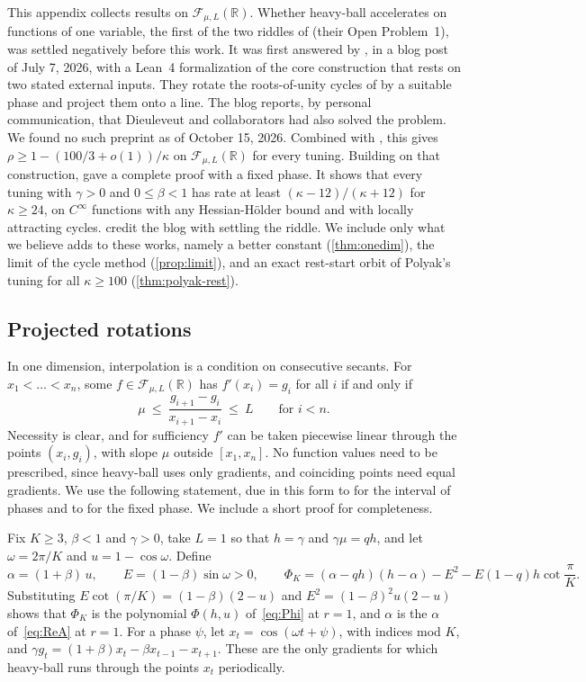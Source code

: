 \documentclass[11pt, a4paper]{article}
\theoremstyle{definition}
\newcommand{\R}{\mathbb{R}}
\newcommand{\F}{\mathcal{F}_{\mu,L}}
\begin{document}
This appendix collects results on $\F(\R)$. Whether heavy-ball accelerates on functions of one variable, the first of
the two riddles of \citet{goujaud2025riddles} (their Open Problem~1), was settled negatively before this work. It was
first answered by \citet{fotopoulos2026cycling}, in a blog post of July 7, 2026, with a Lean~4 formalization of the core
construction that rests on two stated external inputs. They rotate the roots-of-unity cycles of
\citet{goujaud2025provable} by a suitable phase and project them onto a line. The blog reports, by personal
communication, that Dieuleveut and collaborators had also solved the problem. We found no such preprint as of October 15,
2026. Combined with \citet[Thm.~3.6]{goujaud2025provable}, this gives $\rho\ge1-(100/3+o(1))/\kappa$ on $\F(\R)$ for
every tuning. Building on that construction, \citet[App.~F, Thm.~8]{liu2026sharp} gave a complete proof with a fixed
phase. It shows that every tuning with $\gamma>0$ and $0\le\beta<1$ has rate at least $(\kappa-12)/(\kappa+12)$ for
$\kappa\ge24$, on $C^\infty$ functions with any Hessian-H\"older bound and with locally attracting cycles. 
credit the blog with settling the riddle. We include only what we believe adds to these works, namely a better constant
(\cref{thm:onedim}), the limit of the cycle method (\cref{prop:limit}), and an exact rest-start orbit of Polyak's tuning
for all $\kappa\ge100$ (\cref{thm:polyak-rest}).

\subsection{Projected rotations}

In one dimension, interpolation is a condition on consecutive secants. For $x_1<\dots<x_n$, some $f\in\F(\R)$ has
$f'(x_i)=g_i$ for all $i$ if and only if
\[
  \mu\ \le\ \frac{g_{i+1}-g_i}{x_{i+1}-x_i}\ \le\ L\qquad\text{for }i<n.
\]
Necessity is clear, and for
sufficiency $f'$ can be taken piecewise linear through the points $(x_i,g_i)$, with slope $\mu$ outside $[x_1,x_n]$.
No function values need to be prescribed, since heavy-ball uses only gradients, and coinciding points need equal
gradients. We use the following statement, due in this form
to \citet{fotopoulos2026cycling} for the interval of phases and to \citet[App.~F]{liu2026sharp} for the fixed phase. We
include a short proof for completeness.

Fix $K\ge3$, $\beta<1$ and $\gamma>0$, take $L=1$ so that $h=\gamma$ and $\gamma\mu=qh$, and let $\omega=2\pi/K$ and
$u=1-\cos\omega$. Define
\begin{equation}
  \alpha=(1+\beta)\,u,\qquad E=(1-\beta)\sin\omega>0,\qquad
  \Phi_K=(\alpha-qh)(h-\alpha)-E^2-E(1-q)h\cot\frac{\pi}{K}.
  \label{eq:phiK}
\end{equation}
Substituting $E\cot(\pi/K)=(1-\beta)(2-u)$ and $E^2=(1-\beta)^2u(2-u)$ shows that $\Phi_K$ is the polynomial
$\Phi(h,u)$ of~\eqref{eq:Phi} at $r=1$, and $\alpha$ is the $\alpha$ of~\eqref{eq:ReA} at $r=1$. For a phase $\psi$, let
$x_t=\cos(\omega t+\psi)$, with indices mod $K$, and $\gamma g_t=(1+\beta)x_t-\beta x_{t-1}-x_{t+1}$. These are the only
gradients for which heavy-ball runs through the points $x_t$ periodically.
\end{document}
